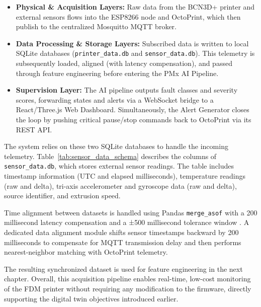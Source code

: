 \begin{itemize}
    \item \textbf{Physical \& Acquisition Layers:} Raw data from the BCN3D+ printer and external sensors flows into the ESP8266 node and OctoPrint, which then publish to the centralized Mosquitto MQTT broker.
    
    \item \textbf{Data Processing \& Storage Layers:} Subscribed data is written to local SQLite databases (\texttt{printer\_data.db} and \texttt{sensor\_data.db}). This telemetry is subsequently loaded, aligned (with latency compensation), and passed through feature engineering before entering the PMx AI Pipeline.
    
    \item \textbf{Supervision Layer:} The AI pipeline outputs fault classes and severity scores, forwarding states and alerts via a WebSocket bridge to a React/Three.js Web Dashboard. Simultaneously, the Alert Generator closes the loop by pushing critical pause/stop commands back to OctoPrint via its REST API.
\end{itemize}

The system relies on these two SQLite databases to handle the incoming telemetry. Table~\ref{tab:sensor_data_schema} describes the columns of \texttt{sensor\_data.db}, which stores external sensor readings. The table includes timestamp information (UTC and elapsed milliseconds), temperature readings (raw and delta), tri-axis accelerometer and gyroscope data (raw and delta), source identifier, and extrusion speed.

{%
    \centering
    
    \label{tab:sensor_data_schema}
}


Time alignment between datasets is handled using Pandas \texttt{merge\_asof} with a 200 millisecond latency compensation and a ±500 millisecond tolerance window \cite{mckinney2010data}. A dedicated data alignment module shifts sensor timestamps backward by 200 milliseconds to compensate for MQTT transmission delay and then performs nearest-neighbor matching with OctoPrint telemetry.

The resulting synchronized dataset is used for feature engineering in the next chapter. Overall, this acquisition pipeline enables real-time, low-cost monitoring of the FDM printer without requiring any modification to the firmware, directly supporting the digital twin objectives introduced earlier.

\endinput
